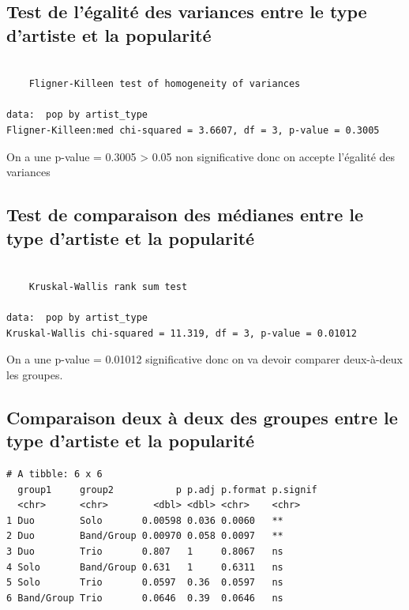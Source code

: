 \documentclass[french,]{compterendu}
\theoremstyle{urcastyle}
\theoremstyle{remark}
\begin{document}
\hypertarget{TestVar1}{%
\subsection{Test de l'égalité des variances entre le type d'artiste et la popularité}\label{TestVar1}}

\begin{verbatim}

    Fligner-Killeen test of homogeneity of variances

data:  pop by artist_type
Fligner-Killeen:med chi-squared = 3.6607, df = 3, p-value = 0.3005
\end{verbatim}

On a une p-value = 0.3005 \textgreater{} 0.05 non significative donc on accepte l'égalité des variances

\hypertarget{TestMed1}{%
\subsection{Test de comparaison des médianes entre le type d'artiste et la popularité}\label{TestMed1}}

\begin{verbatim}

    Kruskal-Wallis rank sum test

data:  pop by artist_type
Kruskal-Wallis chi-squared = 11.319, df = 3, p-value = 0.01012
\end{verbatim}

On a une p-value = 0.01012 significative donc on va devoir comparer deux-à-deux les groupes.

\hypertarget{Comp1}{%
\subsection{Comparaison deux à deux des groupes entre le type d'artiste et la popularité}\label{Comp1}}

\begin{verbatim}
# A tibble: 6 x 6
  group1     group2           p p.adj p.format p.signif
  <chr>      <chr>        <dbl> <dbl> <chr>    <chr>   
1 Duo        Solo       0.00598 0.036 0.0060   **      
2 Duo        Band/Group 0.00970 0.058 0.0097   **      
3 Duo        Trio       0.807   1     0.8067   ns      
4 Solo       Band/Group 0.631   1     0.6311   ns      
5 Solo       Trio       0.0597  0.36  0.0597   ns      
6 Band/Group Trio       0.0646  0.39  0.0646   ns      
\end{verbatim}
\end{document}
